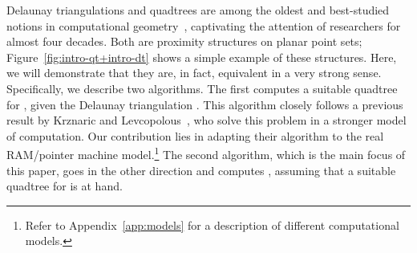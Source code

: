 \documentclass[11pt]{paper}
\begin{document}
  Delaunay triangulations and quadtrees are among the oldest and
  best-studied notions in computational
  geometry~\cite{deBergChvKrOv08,BoissonnatYv98,d-slsv-34,FinkelBe74,m-pdt-97,Samet90,ShamosHo75,PreparataSh85}, captivating the attention of researchers
  for almost four decades. 
  Both are proximity structures on planar point sets;
  Figure~\ref {fig:intro-qt+intro-dt} shows a simple example of these structures.
  Here, we will demonstrate that
  they are, in fact, equivalent in a very strong sense.
Specifically, we describe two algorithms. The first computes a suitable 
  quadtree for , given the Delaunay triangulation . 
  This algorithm closely follows
  a previous result by Krznaric and
  Levcopolous~\cite{KrznaricLe98}, who solve this problem in a stronger
  model of computation. Our contribution lies in adapting
  their algorithm to the real RAM/pointer machine model.\footnote{Refer
  to Appendix~\ref{app:models} for a description of different computational
  models.}
  The second algorithm, which is the main focus of this paper,
  goes in the other direction and computes
  , assuming that a suitable quadtree for  is at hand.
  
\end{document}
